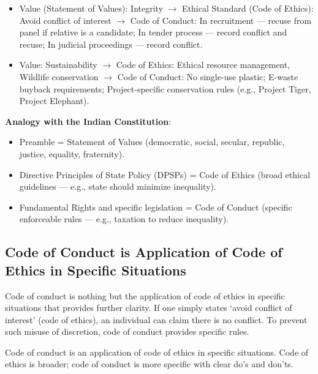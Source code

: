 \begin{ExampleBox}
\begin{itemize}
\item Value (Statement of Values): Integrity $\rightarrow$ Ethical Standard (Code of Ethics): Avoid conflict of interest $\rightarrow$ Code of Conduct: In recruitment --- recuse from panel if relative is a candidate; In tender process --- record conflict and recuse; In judicial proceedings --- record conflict.
\item Value: Sustainability $\rightarrow$ Code of Ethics: Ethical resource management, Wildlife conservation $\rightarrow$ Code of Conduct: No single-use plastic; E-waste buyback requirements; Project-specific conservation rules (e.g., Project Tiger, Project Elephant).
\end{itemize}
\end{ExampleBox}

\begin{ComparisonBox}
\textbf{Analogy with the Indian Constitution}:
\begin{itemize}
\item Preamble = Statement of Values (democratic, social, secular, republic, justice, equality, fraternity).
\item Directive Principles of State Policy (DPSPs) = Code of Ethics (broad ethical guidelines --- e.g., state should minimize inequality).
\item Fundamental Rights and specific legislation = Code of Conduct (specific enforceable rules --- e.g., taxation to reduce inequality).
\end{itemize}
\end{ComparisonBox}

\subsection{Code of Conduct is Application of Code of Ethics in Specific Situations}
Code of conduct is nothing but the application of code of ethics in specific situations that provides further clarity. If one simply states `avoid conflict of interest' (code of ethics), an individual can claim there is no conflict. To prevent such misuse of discretion, code of conduct provides specific rules.

\begin{CriticalPoint}
Code of conduct is an application of code of ethics in specific situations. Code of ethics is broader; code of conduct is more specific with clear do's and don'ts.
\end{CriticalPoint}

